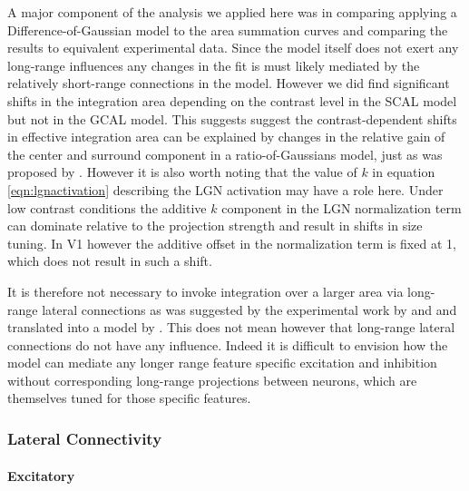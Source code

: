 A major component of the analysis we applied here was in comparing
applying a Difference-of-Gaussian model to the area summation curves
and comparing the results to equivalent experimental data. Since the
model itself does not exert any long-range influences any changes in
the fit is must likely mediated by the relatively short-range
connections in the model. However we did find significant shifts in
the integration area depending on the contrast level in the SCAL model
but not in the GCAL model. This suggests suggest the
contrast-dependent shifts in effective integration area can be
explained by changes in the relative gain of the center and surround
component in a ratio-of-Gaussians model, just as was proposed by
\cite{Cavanaugh2002}. However it is also worth noting that the value
of $k$ in equation \ref{eqn:lgnactivation} describing the LGN
activation may have a role here. Under low contrast conditions the
additive $k$ component in the LGN normalization term can dominate
relative to the projection strength and result in shifts in size
tuning. In V1 however the additive offset in the normalization term is
fixed at 1, which does not result in such a shift.

It is therefore not necessary to invoke integration over a larger area
via long-range lateral connections as was suggested by the
experimental work by \cite{Levitt2002} and \cite{Sceniak2001} and
translated into a model by \cite{Schwabe2006}. This does not mean
however that long-range lateral connections do not have any
influence. Indeed it is difficult to envision how the model can
mediate any longer range feature specific excitation and inhibition
without corresponding long-range projections between neurons, which
are themselves tuned for those specific features.

\subsubsection*{Lateral Connectivity}

\paragraph{Excitatory}

